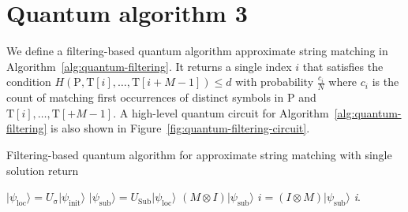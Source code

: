 \section{Quantum algorithm 3}
We define a filtering-based quantum algorithm approximate string matching in Algorithm~\ref{alg:quantum-filtering}. It returns a single index $i$ that satisfies the condition $H(\mathrm{P},\mathrm{T}[i],\ldots,\mathrm{T}[i+M-1]) \leq d$ with probability $\frac{c_{i}}{N}$ where $c_i$ is the count of matching first occurrences of distinct symbols in P and $\mathrm{T}[i],\ldots,\mathrm{T}[+M-1]$. A high-level quantum circuit for Algorithm~\ref{alg:quantum-filtering} is also shown in Figure~\ref{fig:quantum-filtering-circuit}.
\begin{algorithm}[h!]
	\caption{Filtering-based quantum algorithm for approximate string matching with single solution return}
	\label{alg:quantum-filtering}
	\begin{algorithmic}[1]
		\STATE $\vert \psi_{\mathrm{loc}} \rangle = U_{\mathrm{\sigma}} \vert \psi_{\mathrm{init}} \rangle$
		\STATE $\vert \psi_{\mathrm{sub}} \rangle = U_{\mathrm{Sub}} \vert \psi_{\mathrm{loc}} \rangle$
		\STATE $\left(M \otimes I\right) \vert \psi_{\mathrm{sub}} \rangle$
		\STATE $i = \left(I \otimes M\right) \vert \psi_{\mathrm{sub}} \rangle$
		\RETURN \textit{i}.
	\end{algorithmic}
\end{algorithm}

